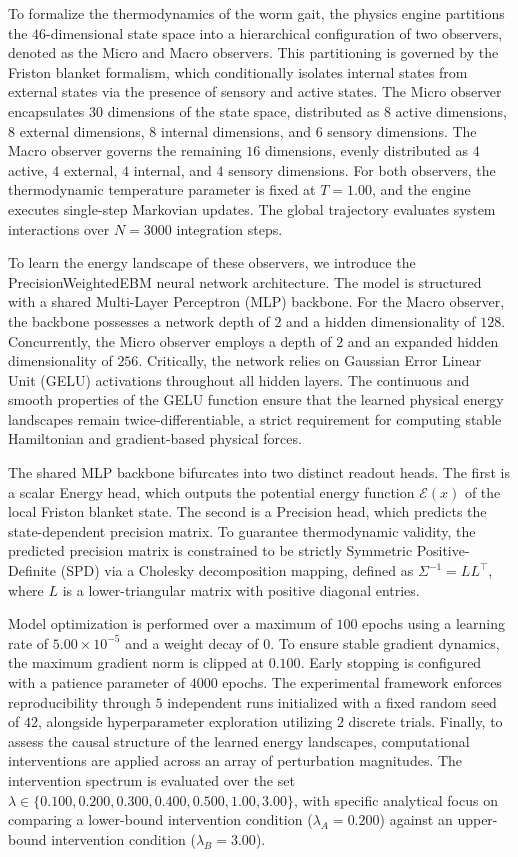 \documentclass{article}
\begin{document}
To formalize the thermodynamics of the worm gait, the physics engine partitions the $46$-dimensional state space into a hierarchical configuration of two observers, denoted as the Micro and Macro observers. This partitioning is governed by the Friston blanket formalism, which conditionally isolates internal states from external states via the presence of sensory and active states. The Micro observer encapsulates $30$ dimensions of the state space, distributed as $8$ active dimensions, $8$ external dimensions, $8$ internal dimensions, and $6$ sensory dimensions. The Macro observer governs the remaining $16$ dimensions, evenly distributed as $4$ active, $4$ external, $4$ internal, and $4$ sensory dimensions. For both observers, the thermodynamic temperature parameter is fixed at $T = 1.00$, and the engine executes single-step Markovian updates. The global trajectory evaluates system interactions over $N = 3000$ integration steps.

To learn the energy landscape of these observers, we introduce the PrecisionWeightedEBM neural network architecture. The model is structured with a shared Multi-Layer Perceptron (MLP) backbone. For the Macro observer, the backbone possesses a network depth of $2$ and a hidden dimensionality of $128$. Concurrently, the Micro observer employs a depth of $2$ and an expanded hidden dimensionality of $256$. Critically, the network relies on Gaussian Error Linear Unit (GELU) activations throughout all hidden layers. The continuous and smooth properties of the GELU function ensure that the learned physical energy landscapes remain twice-differentiable, a strict requirement for computing stable Hamiltonian and gradient-based physical forces.

The shared MLP backbone bifurcates into two distinct readout heads. The first is a scalar Energy head, which outputs the potential energy function $\mathcal{E}(x)$ of the local Friston blanket state. The second is a Precision head, which predicts the state-dependent precision matrix. To guarantee thermodynamic validity, the predicted precision matrix is constrained to be strictly Symmetric Positive-Definite (SPD) via a Cholesky decomposition mapping, defined as $\Sigma^{-1} = L L^{\intercal}$, where $L$ is a lower-triangular matrix with positive diagonal entries.

Model optimization is performed over a maximum of $100$ epochs using a learning rate of $5.00 \times 10^{-5}$ and a weight decay of $0$. To ensure stable gradient dynamics, the maximum gradient norm is clipped at $0.100$. Early stopping is configured with a patience parameter of $4000$ epochs. The experimental framework enforces reproducibility through $5$ independent runs initialized with a fixed random seed of $42$, alongside hyperparameter exploration utilizing $2$ discrete trials. Finally, to assess the causal structure of the learned energy landscapes, computational interventions are applied across an array of perturbation magnitudes. The intervention spectrum is evaluated over the set $\lambda \in \{0.100, 0.200, 0.300, 0.400, 0.500, 1.00, 3.00\}$, with specific analytical focus on comparing a lower-bound intervention condition ($\lambda_{A} = 0.200$) against an upper-bound intervention condition ($\lambda_{B} = 3.00$).
\end{document}

